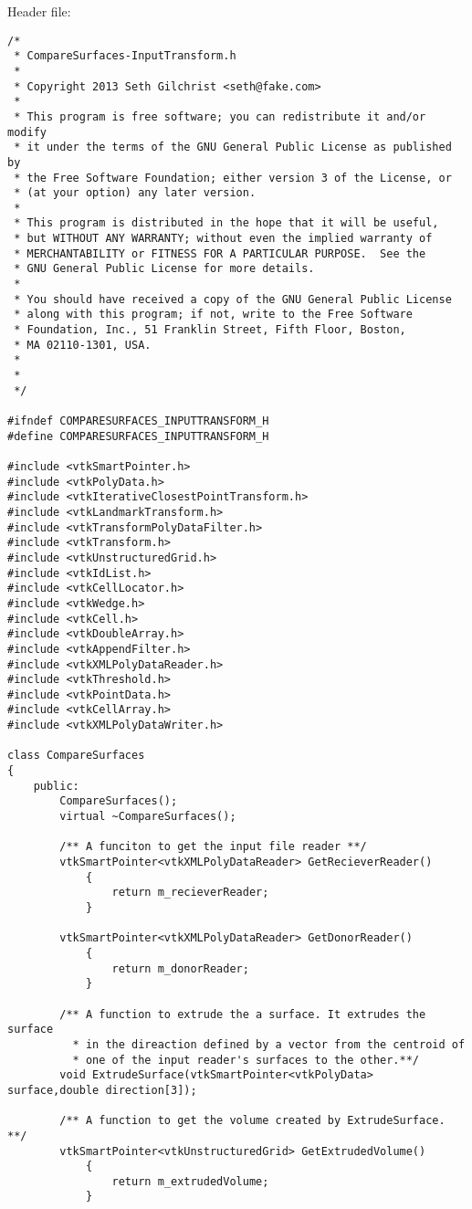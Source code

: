Header file:
\begin{lstlisting}
/*
 * CompareSurfaces-InputTransform.h
 *
 * Copyright 2013 Seth Gilchrist <seth@fake.com>
 *
 * This program is free software; you can redistribute it and/or modify
 * it under the terms of the GNU General Public License as published by
 * the Free Software Foundation; either version 3 of the License, or
 * (at your option) any later version.
 *
 * This program is distributed in the hope that it will be useful,
 * but WITHOUT ANY WARRANTY; without even the implied warranty of
 * MERCHANTABILITY or FITNESS FOR A PARTICULAR PURPOSE.  See the
 * GNU General Public License for more details.
 *
 * You should have received a copy of the GNU General Public License
 * along with this program; if not, write to the Free Software
 * Foundation, Inc., 51 Franklin Street, Fifth Floor, Boston,
 * MA 02110-1301, USA.
 *
 *
 */

#ifndef COMPARESURFACES_INPUTTRANSFORM_H
#define COMPARESURFACES_INPUTTRANSFORM_H

#include <vtkSmartPointer.h>
#include <vtkPolyData.h>
#include <vtkIterativeClosestPointTransform.h>
#include <vtkLandmarkTransform.h>
#include <vtkTransformPolyDataFilter.h>
#include <vtkTransform.h>
#include <vtkUnstructuredGrid.h>
#include <vtkIdList.h>
#include <vtkCellLocator.h>
#include <vtkWedge.h>
#include <vtkCell.h>
#include <vtkDoubleArray.h>
#include <vtkAppendFilter.h>
#include <vtkXMLPolyDataReader.h>
#include <vtkThreshold.h>
#include <vtkPointData.h>
#include <vtkCellArray.h>
#include <vtkXMLPolyDataWriter.h>

class CompareSurfaces
{
    public:
        CompareSurfaces();
        virtual ~CompareSurfaces();

        /** A funciton to get the input file reader **/
        vtkSmartPointer<vtkXMLPolyDataReader> GetRecieverReader()
            {
                return m_recieverReader;
            }

        vtkSmartPointer<vtkXMLPolyDataReader> GetDonorReader()
            {
                return m_donorReader;
            }

        /** A function to extrude the a surface. It extrudes the surface
          * in the direaction defined by a vector from the centroid of
          * one of the input reader's surfaces to the other.**/
        void ExtrudeSurface(vtkSmartPointer<vtkPolyData> surface,double direction[3]);

        /** A function to get the volume created by ExtrudeSurface. **/
        vtkSmartPointer<vtkUnstructuredGrid> GetExtrudedVolume()
            {
                return m_extrudedVolume;
            }


\end{lstlisting}
